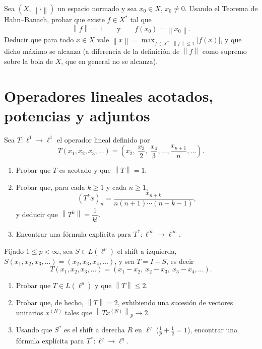 \documentclass{article}
\theoremstyle{definition}
\newcommand{\norm}[1]{\left\lVert #1 \right\rVert}       %
\newenvironment{ejercicio}[1]{\begin{trivlist}
\item[\hskip \labelsep {\bfseries Ejercicio}\hskip \labelsep {\bfseries #1.}]}{\end{trivlist}}
\begin{document}
\begin{ejercicio}{3}
    Sea \( (X, \norm{\cdot}) \) un espacio normado y sea \( x_0 \in X \), \( x_0 \neq 0 \). Usando el Teorema de Hahn--Banach, probar que existe \( f \in X^* \) tal que
    \[
        \norm{f} = 1 \qquad \text{y} \qquad f(x_0) = \norm{x_0}.
    \]
    Deducir que para todo \( x \in X \) vale \( \norm{x} = \max_{f \in X^*,\, \norm{f} \le 1} |f(x)| \), y que dicho máximo se alcanza (a diferencia de la definición de \( \norm{f} \) como supremo sobre la bola de \(X\), que en general no se alcanza).
\end{ejercicio}

\vspace{0.6cm}
\section{Operadores lineales acotados, potencias y adjuntos}

\begin{ejercicio}{4}
    Sea \( T : \ell^1 \to \ell^1 \) el operador lineal definido por
    \[
        T(x_1, x_2, x_3, \dots) = \left( x_2,\ \frac{x_3}{2},\ \frac{x_4}{3}, \dots, \frac{x_{n+1}}{n}, \dots \right).
    \]
    \begin{enumerate}
        \item Probar que \( T \) es acotado y que \( \norm{T} = 1 \).
        \item Probar que, para cada \( k \ge 1 \) y cada \( n \ge 1 \),
              \[
                  {(T^k x)}_n = \frac{x_{n+k}}{n(n+1)\cdots(n+k-1)},
              \]
              y deducir que \( \norm{T^k} = \dfrac{1}{k!} \).
        \item Encontrar una fórmula explícita para \( T^* : \ell^\infty \to \ell^\infty \).
    \end{enumerate}
\end{ejercicio}

\vspace{0.3cm}

\begin{ejercicio}{5}
    Fijado \( 1 \le p < \infty \), sea \( S \in L(\ell^p) \) el shift a izquierda, \( S(x_1,x_2,x_3,\dots) = (x_2,x_3,x_4,\dots) \), y sea \( T = I - S \), es decir
    \[
        T(x_1,x_2,x_3,\dots) = (x_1 - x_2,\ x_2 - x_3,\ x_3-x_4,\dots).
    \]
    \begin{enumerate}
        \item Probar que \( T \in L(\ell^p) \) y que \( \norm{T} \le 2 \).
        \item Probar que, de hecho, \( \norm{T} = 2 \), exhibiendo una sucesión de vectores unitarios \( x^{(N)} \) tales que \( \norm{T x^{(N)}}_p \to 2 \).
        \item Usando que \( S^* \) es el shift a derecha \( R \) en \( \ell^q \) (\( \frac1p+\frac1q=1 \)), encontrar una fórmula explícita para \( T^* : \ell^q \to \ell^q \).
    \end{enumerate}
\end{ejercicio}
\end{document}
